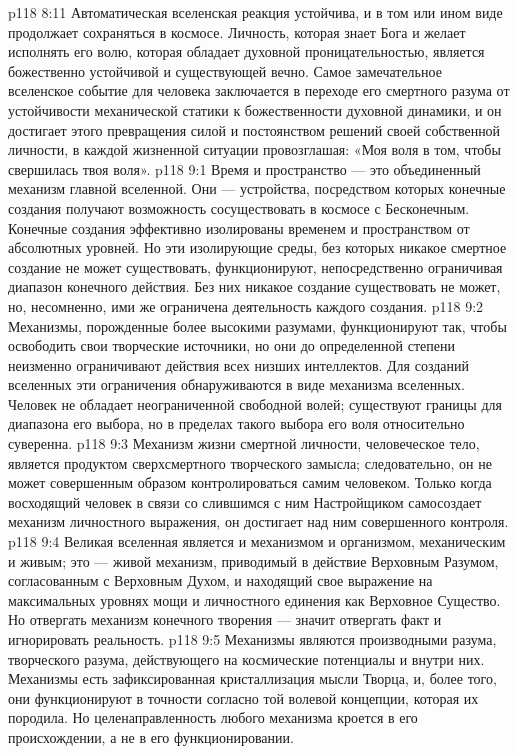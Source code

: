 \vs p118 8:11 Автоматическая вселенская реакция устойчива, и в том или ином виде продолжает сохраняться в космосе. Личность, которая знает Бога и желает исполнять его волю, которая обладает духовной проницательностью, является божественно устойчивой и существующей вечно. Самое замечательное вселенское событие для человека заключается в переходе его смертного разума от устойчивости механической статики к божественности духовной динамики, и он достигает этого превращения силой и постоянством решений своей собственной личности, в каждой жизненной ситуации провозглашая: «Моя воля в том, чтобы свершилась твоя воля».
\vs p118 9:1 Время и пространство --- это объединенный механизм главной вселенной. Они --- устройства, посредством которых конечные создания получают возможность сосуществовать в космосе с Бесконечным. Конечные создания эффективно изолированы временем и пространством от абсолютных уровней. Но эти изолирующие среды, без которых никакое смертное создание не может существовать, функционируют, непосредственно ограничивая диапазон конечного действия. Без них никакое создание существовать не может, но, несомненно, ими же ограничена деятельность каждого создания.
\vs p118 9:2 Механизмы, порожденные более высокими разумами, функционируют так, чтобы освободить свои творческие источники, но они до определенной степени неизменно ограничивают действия всех низших интеллектов. Для созданий вселенных эти ограничения обнаруживаются в виде механизма вселенных. Человек не обладает неограниченной свободной волей; существуют границы для диапазона его выбора, но в пределах такого выбора его воля относительно суверенна.
\vs p118 9:3 Механизм жизни смертной личности, человеческое тело, является продуктом сверхсмертного творческого замысла; следовательно, он не может совершенным образом контролироваться самим человеком. Только когда восходящий человек в связи со слившимся с ним Настройщиком самосоздает механизм личностного выражения, он достигает над ним совершенного контроля.
\vs p118 9:4 Великая вселенная является и механизмом и организмом, механическим и живым; это --- живой механизм, приводимый в действие Верховным Разумом, согласованным с Верховным Духом, и находящий свое выражение на максимальных уровнях мощи и личностного единения как Верховное Существо. Но отвергать механизм конечного творения --- значит отвергать факт и игнорировать реальность.
\vs p118 9:5 Механизмы являются производными разума, творческого разума, действующего на космические потенциалы и внутри них. Механизмы есть зафиксированная кристаллизация мысли Творца, и, более того, они функционируют в точности согласно той волевой концепции, которая их породила. Но целенаправленность любого механизма кроется в его происхождении, а не в его функционировании.
